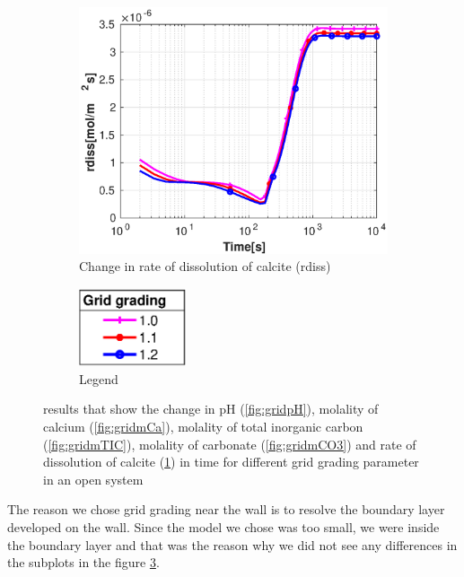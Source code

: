 \begin{figure}[!h]
        \hfill
        \begin{subfigure}{.5\linewidth}
            \centering
        \includegraphics[width=\textwidth]{PICTURES/with_grid_rdiss.eps}
        \caption{Change in rate of dissolution of calcite (rdiss)}
        \label{fig:gridrdiss}
    \end{subfigure}%
        \hfill
        \begin{subfigure}{.5\linewidth}
            \centering
        \includegraphics[width=0.35\textwidth]{PICTURES/with_grid_legend.eps}
        \caption{Legend}
        \label{fig:gridlegend}
    \end{subfigure}%
    \caption{\DuMuX results that show the change in pH (\cref{fig:gridpH}), molality of calcium (\cref{fig:gridmCa}), 
    molality of total inorganic carbon (\cref{fig:gridmTIC}), molality of carbonate (\cref{fig:gridmCO3}) 
    and rate of dissolution of calcite (\cref{fig:gridrdiss}) in time for different grid grading parameter in an open system}
    \label{fig:diffGrid}
\end{figure}

The reason we chose grid grading near the wall is to resolve the boundary layer developed on the wall. Since the model we chose was 
too small, we were inside the boundary layer and that was the reason why we did not see any differences in the subplots in the figure \ref{fig:diffGrid}.

